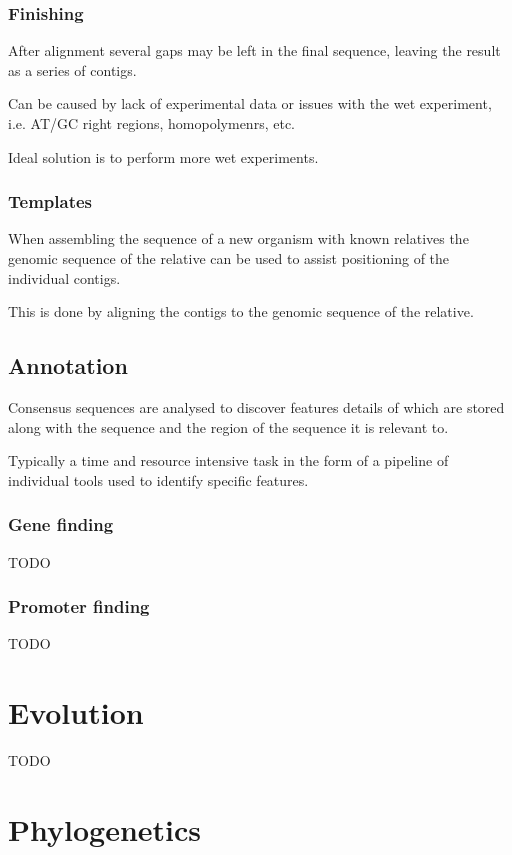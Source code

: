 \documentclass[a4paper]{article}
\begin{document}
\subsubsection{Finishing}

After alignment several gaps may be left in the final sequence, leaving the
result as a series of contigs.

Can be caused by lack of experimental data or issues with the wet experiment,
i.e. AT/GC right regions, homopolymenrs, etc.

Ideal solution is to perform more wet experiments.

\subsubsection{Templates}

When assembling the sequence of a new organism with known relatives the genomic
sequence of the relative can be used to assist positioning of the individual
contigs.

This is done by aligning the contigs to the genomic sequence of the relative.

\subsection{Annotation}

Consensus sequences are analysed to discover features details of which are
stored along with the sequence and the region of the sequence it is relevant to.

Typically a time and resource intensive task in the form of a pipeline of
individual tools used to identify specific features.

\subsubsection{Gene finding}

TODO

\subsubsection{Promoter finding}

TODO

\section{Evolution}

TODO

\section{Phylogenetics}
\end{document}

